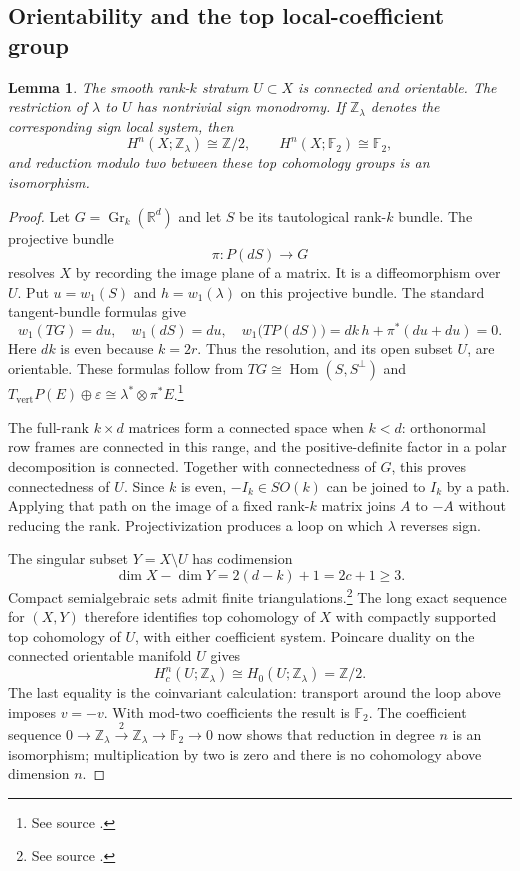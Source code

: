 \documentclass[11pt]{article}
\newtheorem{lemma}[theorem]{Lemma}
\theoremstyle{remark}\newtheorem{remark}[theorem]{Remark}
\newcommand{\R}{\mathbb R}\newcommand{\C}{\mathbb C}\newcommand{\Q}{\mathbb Q}
\newcommand{\Z}{\mathbb Z}\newcommand{\F}{\mathbb F_2}
\newcommand{\eps}{\varepsilon}\newcommand{\Gr}{\operatorname{Gr}}
\newcommand{\fnref}[1]{\footnote{See source \cite{#1}.}}
\begin{document}
\subsection{Orientability and the top local-coefficient group}
\begin{lemma}\label{orient}
The smooth rank-$k$ stratum $U\subset X$ is connected and orientable. The
restriction of $\lambda$ to $U$ has nontrivial sign monodromy. If
$\Z_\lambda$ denotes the corresponding sign local system, then
\[
 H^n(X;\Z_\lambda)\cong\Z/2,
 \qquad H^n(X;\F)\cong\F,
\]
and reduction modulo two between these top cohomology groups is an isomorphism.
\end{lemma}
\begin{proof}
Let $G=\Gr_k(\R^d)$ and let $S$ be its tautological rank-$k$ bundle. The
projective bundle
\[
 \pi:P(dS)\longrightarrow G
\]
resolves $X$ by recording the image plane of a matrix. It is a diffeomorphism
over $U$. Put $u=w_1(S)$ and $h=w_1(\lambda)$ on this projective bundle. The
standard tangent-bundle formulas give
\[
 w_1(TG)=d u,\quad w_1(dS)=d u,\quad
 w_1\bigl(TP(dS)\bigr)=dk\,h+\pi^*(d u+d u)=0.
\]
Here $dk$ is even because $k=2r$. Thus the resolution, and its open subset
$U$, are orientable. These formulas follow from
$TG\cong\operatorname{Hom}(S,S^\perp)$ and
$T_{\mathrm{vert}}P(E)\oplus\eps\cong\lambda^*\otimes\pi^*E$.\fnref{ms}

The full-rank $k\times d$ matrices form a connected space when $k<d$:
orthonormal row frames are connected in this range, and the positive-definite
factor in a polar decomposition is connected. Together with connectedness of
$G$, this proves connectedness of $U$. Since $k$ is even, $-I_k\in SO(k)$ can
be joined to $I_k$ by a path. Applying that path on the image of a fixed
rank-$k$ matrix joins $A$ to $-A$ without reducing the rank. Projectivization
produces a loop on which $\lambda$ reverses sign.

The singular subset $Y=X\setminus U$ has codimension
\[
 \dim X-\dim Y=2(d-k)+1=2c+1\ge3.
\]
Compact semialgebraic sets admit finite triangulations.\fnref{bcr} The long
exact sequence for $(X,Y)$ therefore identifies top cohomology of $X$ with
compactly supported top cohomology of $U$, with either coefficient system.
Poincare duality on the connected orientable manifold $U$ gives
\[
 H_c^n(U;\Z_\lambda)\cong H_0(U;\Z_\lambda)=\Z/2.
\]
The last equality is the coinvariant calculation: transport around the loop
above imposes $v=-v$. With mod-two coefficients the result is $\F$.
The coefficient sequence
$0\to\Z_\lambda\xrightarrow{2}\Z_\lambda\to\F\to0$ now shows that
reduction in degree $n$ is an isomorphism; multiplication by two is zero and
there is no cohomology above dimension $n$.
\end{proof}
\end{document}
